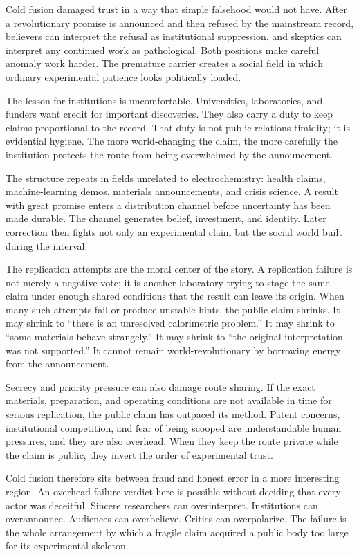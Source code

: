 Cold fusion damaged trust in a way that simple falsehood would not have.
After a revolutionary promise is announced and then refused by the
mainstream record, believers can interpret the refusal as institutional
suppression, and skeptics can interpret any continued work as
pathological. Both positions make careful anomaly work harder. The
premature carrier creates a social field in which ordinary experimental
patience looks politically loaded.

The lesson for institutions is uncomfortable. Universities, laboratories,
and funders want credit for important discoveries. They also carry a
duty to keep claims proportional to the record. That duty is not
public-relations timidity; it is evidential hygiene. The more
world-changing the claim, the more carefully the institution protects the
route from being overwhelmed by the announcement.

The structure repeats in fields unrelated to electrochemistry: health
claims, machine-learning demos, materials announcements, and crisis
science. A result with great promise enters a distribution channel
before uncertainty has been made durable. The channel generates belief,
investment, and identity. Later correction then fights not only an
experimental claim but the social world built during the interval.

The replication attempts are the moral center of the story. A replication
failure is not merely a negative vote; it is another laboratory trying to
stage the same claim under enough shared conditions that the result can
leave its origin. When many such attempts fail or produce unstable hints,
the public claim shrinks. It may shrink to ``there is an unresolved
calorimetric problem.'' It may shrink to ``some materials behave
strangely.'' It may shrink to ``the original interpretation was not
supported.'' It cannot remain world-revolutionary by borrowing energy
from the announcement.

Secrecy and priority pressure can also damage route sharing. If the exact
materials, preparation, and operating conditions are not available in
time for serious replication, the public claim has outpaced its method.
Patent concerns, institutional competition, and fear of being scooped are
understandable human pressures, and they are also overhead. When they
keep the route private while the claim is public, they invert the order
of experimental trust.

Cold fusion therefore sits between fraud and honest error in a more
interesting region. An overhead-failure verdict here is possible without
deciding that every actor was deceitful. Sincere researchers can
overinterpret. Institutions can overannounce. Audiences can overbelieve.
Critics can overpolarize. The failure is the whole arrangement by which a
fragile claim acquired a public body too large for its experimental
skeleton.

